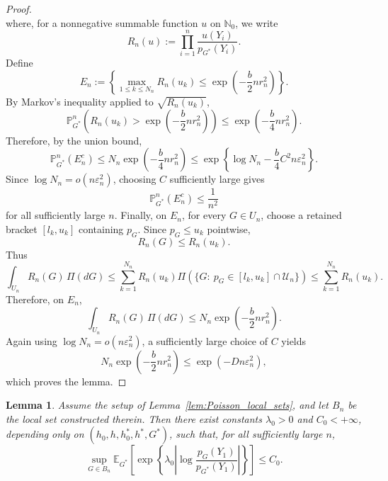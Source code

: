 \documentclass[twoside,12pt]{article}
\newcommand{\E}{\mathds{E}}
\renewcommand{\P}{\mathds{P}}
\newtheorem{lem}[thm]{Lemma}
\begin{document}
\begin{proof}
\begin{displaymath}
\end{displaymath}
where, for a nonnegative summable function $u$ on $\mathbb N_0$, we write
\begin{displaymath}
R_n(u):=\prod_{i=1}^n\frac{u(Y_i)}{p_{G^\ast}(Y_i)}.
\end{displaymath}
Define
\begin{displaymath}
E_n:=\left\{\max_{1\le k\le N_n}R_n(u_k)\le\exp\!\left(-\frac{b}{2}nr_n^2\right)\right\}.
\end{displaymath}
By Markov's inequality applied to $\sqrt{R_n(u_k)}$,
\begin{displaymath}
\P_{G^\ast}^n\!\left(R_n(u_k)>\exp\!\left(-\frac{b}{2}nr_n^2\right)\right)\le\exp\!\left(-\frac{b}{4}nr_n^2\right).
\end{displaymath}
Therefore, by the union bound,
\begin{displaymath}
\P_{G^\ast}^n(E_n^c)\le N_n\exp\!\left(-\frac{b}{4}nr_n^2\right)\le\exp\!\left\{\log N_n-\frac{b}{4}C^2n\varepsilon_n^2\right\}.
\end{displaymath}
Since $\log N_n=o(n\varepsilon_n^2)$, choosing $C$ sufficiently large gives
\begin{displaymath}
\P_{G^\ast}^n(E_n^c)\le \frac{1}{n^2}
\end{displaymath}
for all sufficiently large $n$. Finally, on $E_n$, for every $G\in U_n$, choose a retained bracket $[l_k,u_k]$ containing
$p_G$. Since $p_G\le u_k$ pointwise,
\begin{displaymath}
R_n(G)\le R_n(u_k).
\end{displaymath}
Thus
\begin{displaymath}
\int_{U_n}R_n(G)\,\Pi(dG)\le\sum_{k=1}^{N_n}R_n(u_k)\Pi\!\left(\{G:\ p_G\in [l_k,u_k]\cap\mathcal U_n\}\right)\le\sum_{k=1}^{N_n}R_n(u_k).
\end{displaymath}
Therefore, on $E_n$,
\begin{displaymath}
\int_{U_n}R_n(G)\,\Pi(dG)\le N_n\exp\!\left(-\frac{b}{2}nr_n^2\right).
\end{displaymath}
Again using $\log N_n=o(n\varepsilon_n^2)$, a sufficiently large choice of $C$ yields
\begin{displaymath}
N_n\exp\!\left(-\frac{b}{2}nr_n^2\right)\le\exp(-Dn\varepsilon_n^2),
\end{displaymath}
which proves the lemma.
\end{proof}


\begin{lem}\label{lem:Poisson_HP_exp_moment}
Assume the setup of Lemma~\ref{lem:Poisson_local_sets}, and let $B_n$ be the local set constructed therein. Then there exist constants $\lambda_0>0$ and $C_0<+\infty$, depending only on $(h_0,h,h_0^\ast,h^\ast,G^\ast)$, such that, for all sufficiently large $n$, 
\begin{displaymath}
 \sup_{G\in B_n} \E_{G^\ast}\!\left[ \exp\!\left\{ \lambda_0 \left| \log \frac{p_G(Y_1)}{p_{G^\ast}(Y_1)} \right| \right\} \right] \le C_0 .
 \end{displaymath}
\end{lem}
\end{document}
